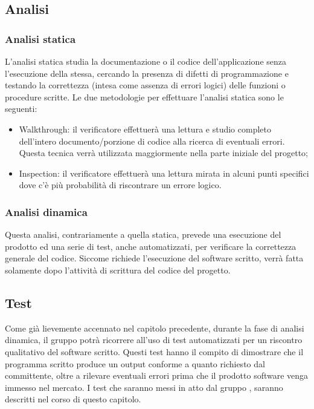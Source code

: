 \subsection{Analisi}
\subsubsection{Analisi statica}
L’analisi statica studia la documentazione o il codice dell’applicazione senza l’esecuzione della stessa, cercando la presenza di difetti di programmazione e testando la correttezza (intesa come assenza di errori logici) delle funzioni o procedure scritte.
Le due metodologie per effettuare l’analisi statica sono le seguenti:
\begin{itemize}
	\item Walkthrough: il verificatore effettuerà una lettura e studio completo dell’intero documento/porzione di codice alla ricerca di eventuali errori. Questa tecnica verrà utilizzata maggiormente nella parte iniziale del progetto;
	\item Inspection: il verificatore effettuerà una lettura mirata in alcuni punti specifici dove c’è più probabilità di riscontrare un errore logico.
\end{itemize}

\subsubsection{Analisi dinamica}
Questa analisi, contrariamente a quella statica, prevede una esecuzione del prodotto ed una serie di test, anche automatizzati, per verificare la correttezza generale del codice. Siccome richiede l’esecuzione del software scritto, verrà fatta solamente dopo l’attività di scrittura del codice del progetto.

\subsection{Test}
Come già lievemente accennato nel capitolo precedente, durante la fase di analisi dinamica, il gruppo {\Gruppo} potrà ricorrere all’uso di test automatizzati per un riscontro qualitativo del software scritto. Questi test hanno il compito di dimostrare che il programma scritto produce un output conforme a quanto richiesto dal committente, oltre a rilevare eventuali errori prima che il prodotto software venga immesso nel mercato. I test che saranno messi in atto dal gruppo {\Gruppo}, saranno descritti nel corso di questo capitolo.

